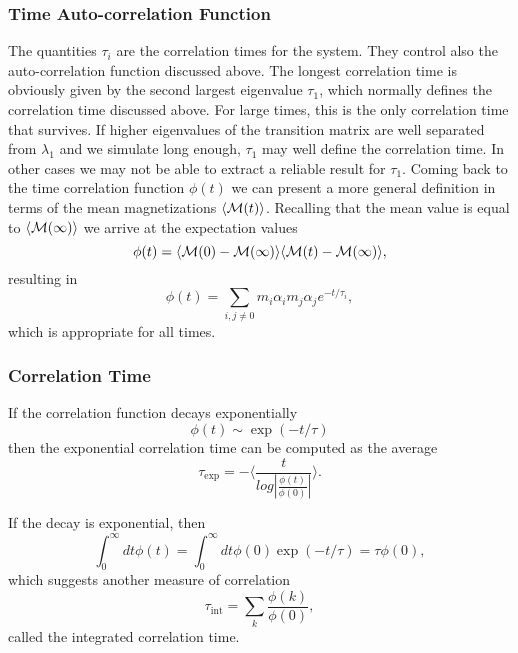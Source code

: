 \frame
{
  \frametitle{Time Auto-correlation Function}
\begin{small}
{\scriptsize
The quantities $\tau_i$ are the correlation times for the system. They control also the auto-correlation function 
discussed above.  The longest correlation time is obviously given by the second largest
eigenvalue $\tau_1$, which normally defines the correlation time discussed above. For large times, this is the 
only correlation time that survives. If higher eigenvalues of the transition matrix are well separated from 
$\lambda_1$ and we simulate long enough,  $\tau_1$ may well define the correlation time. 
In other cases we may not be able to extract a reliable result for $\tau_1$. 
Coming back to the time correlation function $\phi(t)$ we can present a more general definition in terms
of the mean magnetizations $ \langle {\cal M}(t) \rangle$. Recalling that the mean value is equal 
to $ \langle {\cal M}(\infty) \rangle$ we arrive at the expectation values
\[
\phi(t) =\langle {\cal M}(0)-{\cal M}(\infty)\rangle \langle {\cal M}(t)-{\cal M}(\infty)\rangle,
\]
resulting in
\[
\phi(t) =\sum_{i,j\ne 0}m_i\alpha_im_j\alpha_je^{-t/\tau_i},
\]
which is appropriate for all times.
}
\end{small}
}



\frame
{
  \frametitle{Correlation Time}
\begin{small}
{\scriptsize
If the correlation function decays exponentially
\[ \phi (t) \sim \exp{(-t/\tau)}\]
then the exponential correlation time can be computed as the average
\[   \tau_{\mathrm{exp}}  =  -\langle  \frac{t}{log|\frac{\phi(t)}{\phi(0)}|} \rangle. \]

If the decay is exponential, then
\[  \int_0^{\infty} dt \phi(t)  = \int_0^{\infty} dt \phi(0)\exp{(-t/\tau)}  = \tau \phi(0),\] 
which  suggests another measure of correlation
\[   \tau_{\mathrm{int}} = \sum_k \frac{\phi(k)}{\phi(0)}, \]
called the integrated correlation time.
}
\end{small}
}







